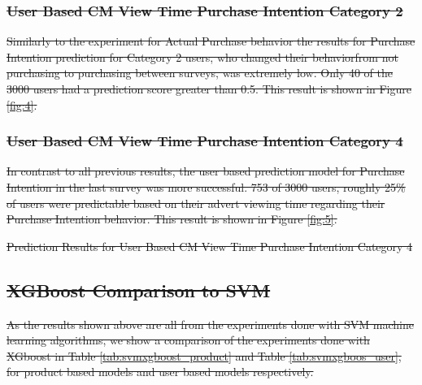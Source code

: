 \documentclass[review]{elsarticle}
\providecommand{\DIFdeltex}[1]{{\protect\color{red}\sout{#1}}}                      %
\providecommand{\DIFdelbegin}{} %
\providecommand{\DIFdelend}{} %
\providecommand{\DIFdelFL}[1]{\DIFdel{#1}} %
\providecommand{\DIFdel}[1]{\texorpdfstring{\DIFdeltex{#1}}{}} %
\newcommand{\DIFscaledelfig}{0.5}
\newlength{\DIFdelgraphicswidth} %
\newlength{\DIFdelgraphicsheight} %
\newcommand{\DIFdelincludegraphics}[2][]{%
\sbox{\DIFdelgraphicsbox}{\DIFOincludegraphics[#1]{#2}}%
\settoboxwidth{\DIFdelgraphicswidth}{\DIFdelgraphicsbox} %
\settoboxtotalheight{\DIFdelgraphicsheight}{\DIFdelgraphicsbox} %
\scalebox{\DIFscaledelfig}{%
\parbox[b]{\DIFdelgraphicswidth}{\usebox{\DIFdelgraphicsbox}\\[-\baselineskip] \rule{\DIFdelgraphicswidth}{0em}}\llap{\resizebox{\DIFdelgraphicswidth}{\DIFdelgraphicsheight}{%
\setlength{\unitlength}{\DIFdelgraphicswidth}%
\begin{picture}(1,1)%
\thicklines\linethickness{2pt} %
{\color[rgb]{1,0,0}\put(0,0){\framebox(1,1){}}}%
{\color[rgb]{1,0,0}\put(0,0){\line( 1,1){1}}}%
{\color[rgb]{1,0,0}\put(0,1){\line(1,-1){1}}}%
\end{picture}%
}\hspace*{3pt}}} %
} %
\DeclareRobustCommand{\DIFdelbegin}{\DIFOdelbegin \let\includegraphics\DIFdelincludegraphics} %
\DeclareRobustCommand{\DIFdelend}{\DIFOaddend \let\includegraphics\DIFOincludegraphics} %
\begin{document}
\DIFdelbegin \subsubsection{\DIFdel{User Based CM View Time \textperiodcentered  Purchase Intention Category 2}}
\addtocounter{subsubsection}{-1}%
\DIFdelend 

\DIFdelbegin \DIFdel{Similarly to the experiment for Actual Purchase behavior the results for Purchase Intention prediction for Category 2 users, who changed their behaviorfrom not purchasing to purchasing between surveys, was extremely low. Only 40 of the 3000 users had a prediction score greater than 0.5. This result is shown in Figure \ref{fig:4}. }%


\subsubsection{\DIFdel{User Based CM View Time \textperiodcentered  Purchase Intention Category 4}}
\addtocounter{subsubsection}{-1}%

\DIFdel{In contrast to all previous results, the user based prediction model for Purchase Intention in the last survey was more successful. 753 of 3000 users, roughly 25\% of users were predictable based on their advert viewing time regarding their Purchase Intention behavior.
This result is shown in Figure \ref{fig:5}.
}%

{%
\DIFdelFL{Prediction Results for User Based CM View Time \textperiodcentered  Purchase Intention Category 4}}

\subsection{\DIFdel{XGBoost Comparison to SVM}}
\addtocounter{subsection}{-1}%

\DIFdel{As the results shown above are all from the experiments done with SVM machine learning algorithms, we show a comparison of the experiments done with XGboost in Table \ref{tab:svmxgboost_product} and Table \ref{tab:svmxgboos_user}, for product based models and user based models respectively. 
}%
\end{document}

